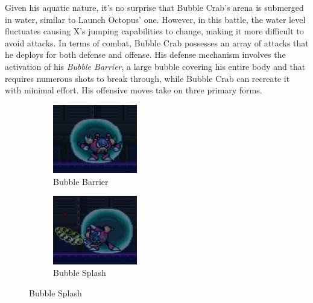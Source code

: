 Given his aquatic nature, it's no surprise that Bubble Crab's arena is submerged in water, similar to Launch Octopus' one. However, in this battle, the water level fluctuates causing X's jumping capabilities to change, making it more difficult to avoid attacks. In terms of combat, Bubble Crab possesses an array of attacks that he deploys for both defense and offense. His defense mechanism involves the activation of his \emph{Bubble Barrier}, a large bubble covering his entire body and that requires numerous shots to break through, while Bubble Crab can recreate it with minimal effort. His offensive moves take on three primary forms.
\begin{figure}[htp]
	\centering
	\begin{subfigure}{0.35\linewidth}
		\centering
		\includegraphics[height=3cm]{figures/X2/Bubble_crab/Crab_bubble.png}
		\caption{Bubble Barrier}
	\end{subfigure}
	\begin{subfigure}{0.35\linewidth}
		\centering
		\includegraphics[height=3cm]{figures/X2/Bubble_crab/Crab_splasher.png}
		\caption{Bubble Splash}
	\end{subfigure}
\end{figure}
